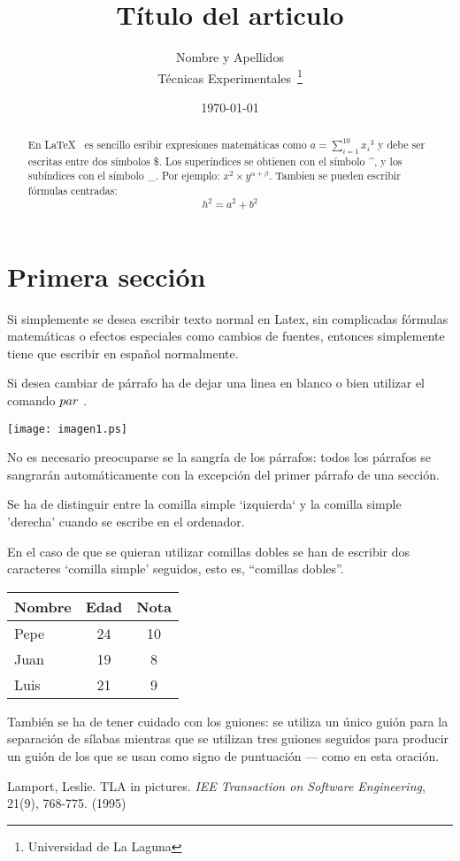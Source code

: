 \documentclass[a4paper,12pt]{article}
\begin{document}
\title{Título del articulo}
\author{Nombre y Apellidos\\
	Técnicas Experimentales~\footnote{Universidad de La Laguna}
	}
\date{\today}
\maketitle

\begin{abstract}
  En \LaTeX{}~\cite{Lam:86} es sencillo esribir expresiones
  matemáticas como $a=\sum_{i=1}^{10} {x_i}^{3}$
  y debe ser escritas entre dos símbolos \$.
  Los superíndices se obtienen con el símbolo \^{}, y
  los subíndices con el símbolo \_.
  Por ejemplo: $x^2 \times y^{\alpha + \beta}$.
  Tambien se pueden escribir fórmulas centradas:
  \[h^2=a^2 + b^2 \]
\end{abstract}

\section{Primera sección}
Si simplemente se desea escribir texto normal en Latex,
sin complicadas f\'ormulas matem\'aticas o efectos especiales
como cambios de fuentes, entonces simplemente tiene que escribir
en espa\~nol normalmente.\par
Si desea cambiar de párrafo ha de dejar una linea en blanco o bien
utilizar el comando $\\par$ .

\texttt{[image: imagen1.ps]}

No es necesario preocuparse se la sangría de los párrafos:
todos los párrafos se sangrarán automáticamente con la excepción
del primer párrafo de una sección.

Se ha de distinguir entre la comilla simple `izquierda`
y la comilla simple 'derecha' cuando se escribe en el ordenador.

En el caso de que se quieran utilizar comillas dobles se han de 
escribir dos caracteres `comilla simple' seguidos, esto es, 
``comillas dobles''.

\bigskip
 \begin{tabular}{|l|c|c|}
 \hline
 Nombre & Edad & Nota \\ \hline
 Pepe & 24 & 10 \\ \hline
 Juan & 19 & 8 \\ \hline
 Luis & 21 & 9 \\ \hline
 \end{tabular}

 También se ha de tener cuidado con los guiones: se utiliza un único
guión para la separación de sílabas mientras que se utilizan
tres guiones seguidos para producir un guión de los que se usan
como signo de puntuación --- como en esta oración.

\begin{thebibliography}{00}
    Lamport, Leslie.
    TLA in pictures.
    \emph{IEE Transaction on Software Engineering},
    21(9), 768-775.
    (1995)
\end{thebibliography}   
\end{document}
